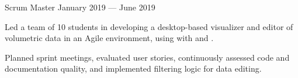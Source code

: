 \begin{cventries}
{\begin{cvitems}
		\end{cvitems}
	}
	{Scrum Master}
	{January 2019 --- June 2019} %
	{}
	{%
		\begin{cvitems}
		\item Led a team of 10 students in developing a desktop-based visualizer and editor of volumetric data in an Agile environment, using  with  and .
		\item Planned sprint meetings, evaluated user stories, continuously assessed code and documentation quality, and implemented filtering logic for data editing.
		\end{cvitems}
	}
\end{cventries}
